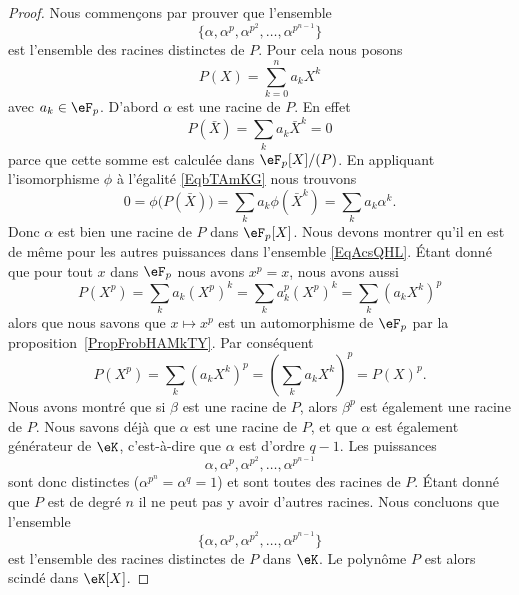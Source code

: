 \begin{proof}
	Nous commençons par prouver que l'ensemble
	\begin{equation}        \label{EqAcsQHL}
		\{ \alpha,\alpha^p,\alpha^{p^2},\ldots, \alpha^{p^{n-1}} \}
	\end{equation}
	est l'ensemble des racines distinctes de \( P\). Pour cela nous posons
	\begin{equation}
		P(X)=\sum_{k=0}^na_kX^k
	\end{equation}
	avec \( a_k\in\eF_p\). D'abord \( \alpha\) est une racine de \( P\). En effet
	\begin{equation}        \label{EqbTAmKG}
		P(\bar X)=\sum_ka_k\bar X^k=0
	\end{equation}
	parce que cette somme est calculée dans \( \eF_p[X]/(P)\). En appliquant l'isomorphisme \( \phi\) à l'égalité \eqref{EqbTAmKG} nous trouvons
	\begin{equation}
		0=\phi\big( P(\bar X) \big)=\sum_ka_k\phi(\bar X^k)=\sum_ka_k\alpha^k.
	\end{equation}
	Donc \( \alpha\) est bien une racine de \( P\) dans \( \eF_p[X]\). Nous devons montrer qu'il en est de même pour les autres puissances dans l'ensemble \eqref{EqAcsQHL}. Étant donné que pour tout \( x\) dans \( \eF_p\) nous avons \( x^p=x\), nous avons aussi
	\begin{equation}
		P(X^p)=\sum_ka_k(X^p)^k=\sum_ka_k^p(X^p)^k=\sum_k(a_kX^k)^p
	\end{equation}
	alors que nous savons que \( x\mapsto x^p\) est un automorphisme de \( \eF_p\) par la proposition~\ref{PropFrobHAMkTY}. Par conséquent
	\begin{equation}
		P(X^p)=\sum_k(a_kX^k)^p=\left( \sum_k a_kX^k\right)^p=P(X)^p.
	\end{equation}
	Nous avons montré que si \( \beta\) est une racine de \( P\), alors \( \beta^p\) est également une racine de \( P\). Nous savons déjà que \( \alpha\) est une racine de \( P\), et que \( \alpha\) est également générateur de \( \eK\), c'est-à-dire que \( \alpha\) est d'ordre \( q-1\). Les puissances
	\begin{equation}
		\alpha,\alpha^p,\alpha^{p^2},\ldots, \alpha^{p^{n-1}}
	\end{equation}
	sont donc distinctes (\( \alpha^{p^n}=\alpha^q=1\)) et sont toutes des racines de \( P\). Étant donné que \( P\) est de degré \( n\) il ne peut pas y avoir d'autres racines. Nous concluons que l'ensemble
	\begin{equation}
		\{ \alpha,\alpha^p,\alpha^{p^2},\ldots, \alpha^{p^{n-1}}\}
	\end{equation}
	est l'ensemble des racines distinctes de \( P\) dans \( \eK\). Le polynôme \( P\) est alors scindé dans \( \eK[X]\).


\end{proof}
